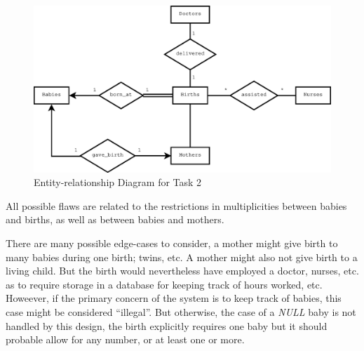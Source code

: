 \begin{figure}[htbp]
  \centering
  \includegraphics[width=\linewidth]{include/task2.eps}
    \caption{Entity-relationship Diagram for Task 2}
  \label{fig:task2}
\end{figure}


All possible flaws are related to the restrictions in multiplicities between
babies and births, as well as between babies and mothers.

There are many possible edge-cases to consider, a mother might give birth to
many babies during one birth; twins, etc.
A mother might also not give birth to a living child. But the birth would
nevertheless have employed a doctor, nurses, etc. as to require storage in a
database for keeping track of hours worked, etc. Howeever, if the primary
concern of the system is to keep track of babies, this case might be considered
``illegal''. But otherwise, the case of a \emph{NULL} baby is not handled by
this design, the birth explicitly requires one baby but it should probable
allow for any number, or at least one or more.
